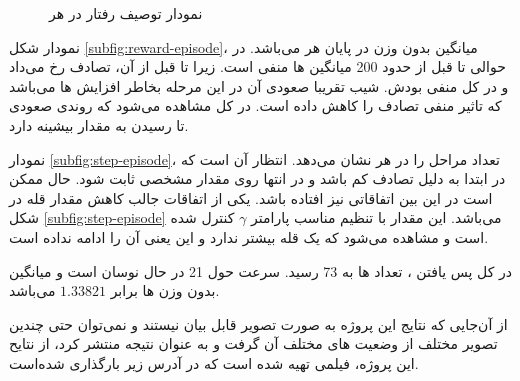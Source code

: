 \begin{figure}
	\centering
	\caption{نمودار توصیف رفتار  در هر }
	\label{fig:episode-chart}
\end{figure}

نمودار شکل \ref{subfig:reward-episode}، میانگین بدون وزن  در پایان هر  می‌باشد. در حوالی تا قبل از حدود 200 میانگین  ها منفی است. زیرا تا قبل از آن، تصادف رخ می‌داد و در کل منفی بودش. شیب تقریبا صعودی آن در این مرحله بخاطر افزایش ها می‌باشد که تاثیر منفی تصادف را کاهش داده است. در کل مشاهده می‌شود که روندی صعودی تا رسیدن به مقدار بیشینه  دارد.

نمودار \ref{subfig:step-episode}، تعداد مراحل را در هر  نشان می‌دهد. انتظار آن است که در ابتدا به دلیل تصادف کم باشد و در انتها روی مقدار مشخصی ثابت شود. حال ممکن است در این بین اتفاقاتی نیز افتاده باشد. یکی از اتفاقات جالب کاهش مقدار قله در شکل \ref{subfig:step-episode} می‌باشد. این مقدار با تنظیم مناسب پارامتر $\gamma$ کنترل شده است و مشاهده می‌شود که یک قله بیشتر ندارد و این یعنی آن  را ادامه نداده است.

در کل پس یافتن ، تعداد ها به 73 رسید. سرعت  حول 21 در حال نوسان است و میانگین بدون وزن ها برابر $1.33821$ می‌باشد.

از آن‌جایی که نتایج این پروژه به صورت تصویر قابل بیان نیستند و نمی‌توان حتی چندین تصویر مختلف از وضعیت های مختلف آن گرفت و به عنوان نتیجه منتشر کرد، 
از نتایح این پروژه، فیلمی تهیه شده است که در آدرس زیر بارگذاری شده‌است.
\begin{center}
\end{center}

